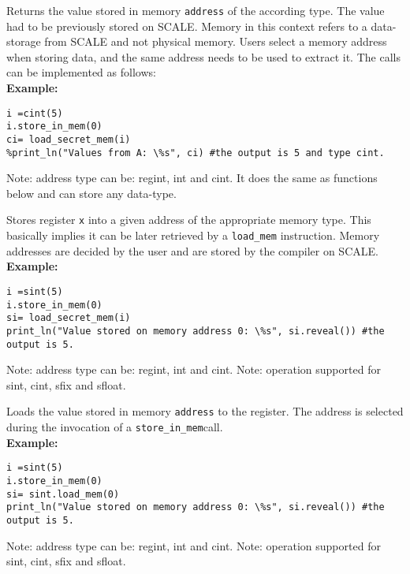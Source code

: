 Returns the value stored in memory \verb|address| of the according type. The value had to be previously stored on SCALE. Memory in this context refers to a data-storage from SCALE and not physical memory. Users select a memory address when storing data, and the same address needs to be used to extract it. The calls can be implemented as follows: \\
\textbf{Example:}
\begin{lstlisting}
i =cint(5)
i.store_in_mem(0)
ci= load_secret_mem(i)
%print_ln("Values from A: \%s", ci) #the output is 5 and type cint.
\end{lstlisting}
\begin{footnotesize}
Note: address type can be: regint, int and cint. It does the same as functions below and can store any data-type.
\end{footnotesize}

Stores register \verb|x| into a given address
of the appropriate memory type. This basically implies it can be later retrieved by a \verb|load_mem| instruction. Memory addresses are decided by the user and are  stored by the compiler on SCALE. \\
\textbf{Example:}
\begin{lstlisting}
i =sint(5)
i.store_in_mem(0)
si= load_secret_mem(i)
print_ln("Value stored on memory address 0: \%s", si.reveal()) #the output is 5.
\end{lstlisting}
\begin{footnotesize}
Note: address type can be: regint, int and cint.
Note: operation supported for sint, cint, sfix and sfloat.
\end{footnotesize}

Loads the value stored in memory \verb|address| to the register. 
The address is selected during the invocation of a \verb|store_in_mem|call. \\
\textbf{Example:}
\begin{lstlisting}
i =sint(5)
i.store_in_mem(0)
si= sint.load_mem(0)
print_ln("Value stored on memory address 0: \%s", si.reveal()) #the output is 5.
\end{lstlisting}
\begin{footnotesize}
Note: address type can be: regint, int and cint.
Note: operation supported for sint, cint, sfix and sfloat.
\end{footnotesize}


